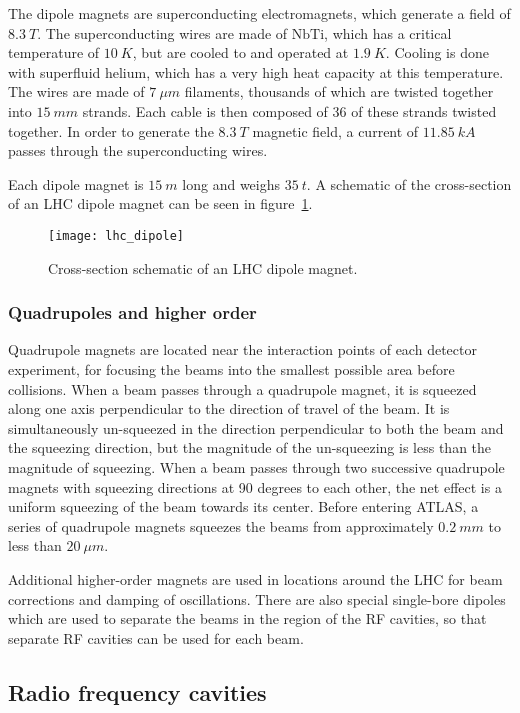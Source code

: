 The dipole magnets are superconducting electromagnets, which generate a field of $8.3~T$.
The superconducting wires are made of $\mathrm{NbTi}$, which has a critical temperature of $10~K$,
but are cooled to and operated at $1.9~K$.
Cooling is done with superfluid helium, which has a very high heat capacity at this temperature.
The wires are made of $7~\mu m$ filaments, thousands of which are twisted together into $15~mm$ strands.
Each cable is then composed of 36 of these strands twisted together.
In order to generate the $8.3~T$ magnetic field, a current of $11.85~kA$ passes through the superconducting wires.

Each dipole magnet is $15~m$ long and weighs $35~t$.
A schematic of the cross-section of an LHC dipole magnet can be seen in figure~\ref{fig:lhc_dipole}.

\begin{figure}[!ht]\centering
\texttt{[image: lhc\_dipole]}
\caption{Cross-section schematic of an LHC dipole magnet. }
\label{fig:lhc_dipole}\cite{lhc-dipole}
\end{figure}

\subsubsection{Quadrupoles and higher order}

Quadrupole magnets are located near the interaction points of each detector experiment,
for focusing the beams into the smallest possible area before collisions.
When a beam passes through a quadrupole magnet, it is squeezed along one axis perpendicular to the direction of travel of the beam.
It is simultaneously un-squeezed in the direction perpendicular to both the beam and the squeezing direction,
but the magnitude of the un-squeezing is less than the magnitude of squeezing.
When a beam passes through two successive quadrupole magnets with squeezing directions at 90 degrees to each other,
the net effect is a uniform squeezing of the beam towards its center.
Before entering ATLAS, a series of quadrupole magnets squeezes the beams from approximately $0.2~mm$ to less than $20~\mu m$.

Additional higher-order magnets are used in locations around the LHC for beam corrections and damping of oscillations.
There are also special single-bore dipoles which are used to separate the beams in the region of the RF cavities,
so that separate RF cavities can be used for each beam.

\subsection{Radio frequency cavities}\label{subsec:lhc_rf}

